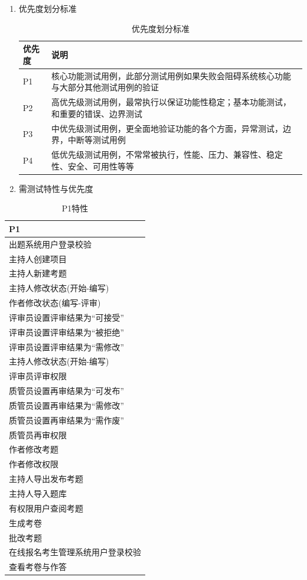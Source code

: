 \documentclass[hyperref, a4paper]{ctexart}
\providecommand{\tightlist}{%
  \setlength{\itemsep}{0pt}\setlength{\parskip}{0pt}}
\begin{document}
\begin{enumerate}
\def\labelenumi{\arabic{enumi}.}
\tightlist
\item
  优先度划分标准

  \begin{table}[h]
  \centering
  \caption{优先度划分标准}
  \begin{tabular}{|p{2cm}|p{8cm}|}
  \hline
  优先度 & 说明\\
  \hline
  P1 & 核心功能测试用例，此部分测试用例如果失败会阻碍系统核心功能与大部分其他测试用例的验证\\
  \hline
  P2 & 高优先级测试用例，最常执行以保证功能性稳定；基本功能测试，和重要的错误、边界测试\\
  \hline
  P3 & 中优先级测试用例，更全面地验证功能的各个方面，异常测试，边界，中断等测试用例\\
  \hline
  P4 & 低优先级测试用例，不常常被执行，性能、压力、兼容性、稳定性、安全、可用性等等\\
  \hline
  \end{tabular}
  \end{table}
\item
  需测试特性与优先度
\end{enumerate}

\begin{table}
\centering
\caption{P1特性}
\begin{tabular}{|p{10cm}|}
\hline
P1\\
\hline
出题系统用户登录校验\\
\hline
主持人创建项目\\
\hline
主持人新建考题\\
\hline
主持人修改状态(开始-编写)\\
\hline
作者修改状态(编写-评审) \\
\hline
评审员设置评审结果为“可接受” \\
\hline
评审员设置评审结果为“被拒绝”\\
\hline
评审员设置评审结果为“需修改” \\
\hline
主持人修改状态(开始-编写)\\
\hline
评审员评审权限\\
\hline
质管员设置再审结果为“可发布” \\
\hline
质管员设置再审结果为“需修改” \\
\hline
质管员设置再审结果为“需作废”\\
\hline
质管员再审权限\\
\hline
作者修改考题\\
\hline
作者修改权限\\
\hline
主持人导出发布考题\\
\hline
主持人导入题库\\
\hline
有权限用户查阅考题\\
\hline
生成考卷\\
\hline
批改考题\\
\hline
在线报名考生管理系统用户登录校验\\
\hline
查看考卷与作答\\
\hline
\end{tabular}
\end{table}
\end{document}
